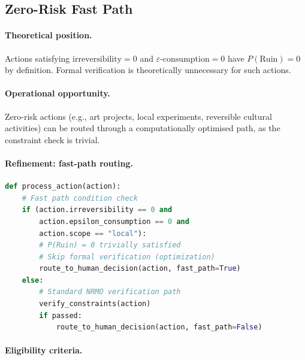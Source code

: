 \subsection{Zero-Risk Fast Path}
\label{sec:zero-risk-fast-path}

\paragraph{Theoretical position.}
Actions satisfying $\mathrm{irreversibility} = 0$ and
$\varepsilon\text{-consumption} = 0$ have $P(\mathrm{Ruin}) = 0$ by
definition. Formal verification is theoretically unnecessary for
such actions.

\paragraph{Operational opportunity.}
Zero-risk actions (e.g., art projects, local experiments, reversible
cultural activities) can be routed through a computationally
optimised path, as the constraint check is trivial.

\paragraph{Refinement: fast-path routing.}

\begin{lstlisting}[language=Python,basicstyle=\ttfamily\small,frame=single]
def process_action(action):
    # Fast path condition check
    if (action.irreversibility == 0 and
        action.epsilon_consumption == 0 and
        action.scope == "local"):
        # P(Ruin) = 0 trivially satisfied
        # Skip formal verification (optimization)
        route_to_human_decision(action, fast_path=True)
    else:
        # Standard NRMO verification path
        verify_constraints(action)
        if passed:
            route_to_human_decision(action, fast_path=False)
\end{lstlisting}

\paragraph{Eligibility criteria.}

